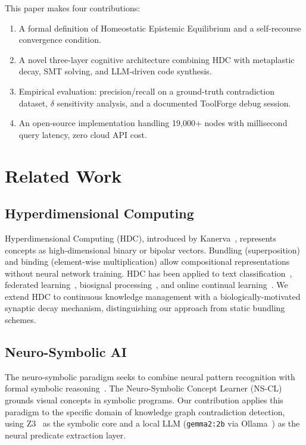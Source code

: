 \documentclass[sigconf]{acmart}
\begin{document}
This paper makes four contributions:
\begin{enumerate}
  \item A formal definition of Homeostatic Epistemic Equilibrium and a self-recourse convergence condition.
  \item A novel three-layer cognitive architecture combining HDC with metaplastic decay, SMT solving, and LLM-driven code synthesis.
  \item Empirical evaluation: precision/recall on a ground-truth contradiction dataset, $\delta$ sensitivity analysis, and a documented ToolForge debug session.
  \item An open-source implementation handling 19,000+ nodes with millisecond query latency, zero cloud API cost.
\end{enumerate}

\section{Related Work}

\subsection{Hyperdimensional Computing}
Hyperdimensional Computing (HDC), introduced by Kanerva~\cite{kanerva2009}, represents concepts as high-dimensional binary or bipolar vectors. Bundling (superposition) and binding (element-wise multiplication) allow compositional representations without neural network training. HDC has been applied to text classification~\cite{hdc_text}, federated learning~\cite{fedhd}, biosignal processing~\cite{hdc_biosignal}, and online continual learning~\cite{hdc_online}. We extend HDC to continuous knowledge management with a biologically-motivated synaptic decay mechanism, distinguishing our approach from static bundling schemes.

\subsection{Neuro-Symbolic AI}
The neuro-symbolic paradigm seeks to combine neural pattern recognition with formal symbolic reasoning~\cite{garcez2020,sarker2021}. The Neuro-Symbolic Concept Learner (NS-CL)~\cite{nscl} grounds visual concepts in symbolic programs. Our contribution applies this paradigm to the specific domain of knowledge graph contradiction detection, using Z3~\cite{z3} as the symbolic core and a local LLM (\texttt{gemma2:2b} via Ollama~\cite{gemma2024}) as the neural predicate extraction layer.
\end{document}
